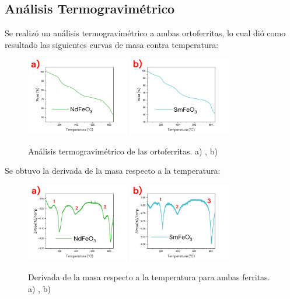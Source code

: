 \documentclass[../main.tex]{subfiles}
\begin{document}
\subsection{Análisis Termogravimétrico} \label{sec:TGA}
Se realizó un análisis termogravimétrico a ambas ortoferritas, lo cual dió como resultado las siguientes curvas de masa contra temperatura:
\begin{figure}[H]
    \centering
    \includegraphics[width=0.4\textwidth]{fig/TGA-NdFeO3.png}
    \quad
    \includegraphics[width=0.4\textwidth]{fig/TGA-SmFeO3.png}
    \caption{Análisis termogravimétrico de las ortoferritas. a) \neod{}, b) \sama{}}
    \label{fig:TGAres}
\end{figure}
Se obtuvo la derivada de la masa respecto a la temperatura:
\begin{figure}[H]
    \centering
    \includegraphics[width=0.4\textwidth]{fig/TGA-derNdFeO3.png}
    \quad
    \includegraphics[width=0.4\textwidth]{fig/TGA-derSmFeO3.png}
    \caption{Derivada de la masa respecto a la temperatura para ambas ferritas. a) \neod{}, b) \sama{}}
    \label{fig:derTGAres}
\end{figure}
\end{document}
